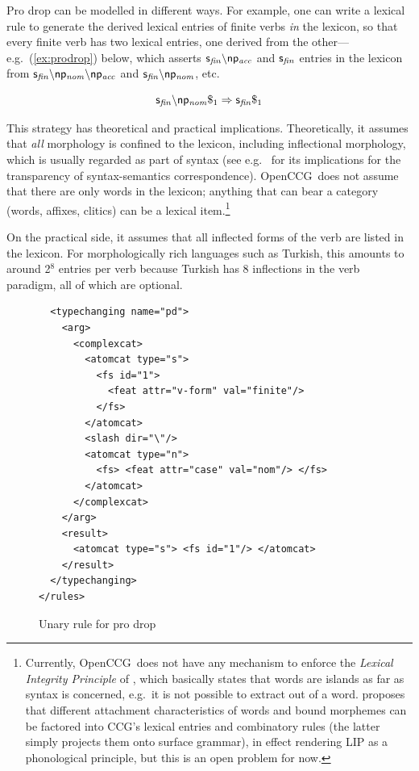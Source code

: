 \documentclass[11pt]{article}
\newcommand{\occg}{OpenCCG}
\begin{document}
Pro drop can be modelled in different ways. For example, one can write a
lexical rule to generate the derived lexical entries of finite verbs
\emph{in} the lexicon, so that every finite verb has two lexical
entries, one derived from the other---e.g.\ (\ref{ex:prodrop}) below,
which asserts $\mathsf{s_{\mathit{fin}}}\backslash\mathsf{np_{\mathit{acc}}}$ and $\mathsf{s_{\mathit{fin}}}$
entries in the lexicon from
$\mathsf{s_{\mathit{fin}}}\backslash\mathsf{np_{\mathit{nom}}}\backslash\mathsf{np_{\mathit{acc}}}$ and
$\mathsf{s_{\mathit{fin}}}\backslash\mathsf{np_{\mathit{nom}}}$, etc.

\begin{equation}
\label{ex:prodrop}
\mathsf{s_{\mathit{fin}}}\backslash\mathsf{np_{\mathit{nom}}}\$_1
\Rightarrow 
\mathsf{s_{\mathit{fin}}}\$_1
\end{equation}

This strategy has theoretical and practical implications. Theoretically,
it assumes that \emph{all} morphology is confined to the lexicon,
including inflectional morphology, which is usually regarded as part of
syntax (see e.g.\ \cite{bozsahin02cl} for its implications for the
transparency of syntax-semantics correspondence). \occg\ does not assume
that there are only words in the lexicon; anything that can bear a
category (words, affixes, clitics) can be a lexical
item.\footnote{Currently, \occg\ does not have any mechanism to enforce
the \emph{Lexical Integrity Principle} of \cite{bresnanmchombo95}, which
basically states that words are islands as far as syntax is concerned,
e.g.\ it is not possible to extract out of a word. \cite{bozsahin02cl}
proposes that different attachment characteristics of words and bound
morphemes can be factored into CCG's lexical entries and combinatory
rules (the latter simply projects them onto surface grammar), in effect
rendering LIP as a phonological principle, but this is an open problem
for now.}

On the practical side, it assumes that all inflected forms of the verb
are listed in the lexicon. For morphologically rich languages such as
Turkish, this amounts to around 2$^{8}$ entries per verb because Turkish
has 8 inflections in the verb paradigm, all of which are optional.

\begin{figure}
\begin{verbatim}
  <typechanging name="pd">
    <arg>
      <complexcat>
        <atomcat type="s"> 
          <fs id="1"> 
            <feat attr="v-form" val="finite"/>
          </fs>
        </atomcat>
        <slash dir="\"/>
        <atomcat type="n"> 
          <fs> <feat attr="case" val="nom"/> </fs>
        </atomcat>
      </complexcat>
    </arg>
    <result>
      <atomcat type="s"> <fs id="1"/> </atomcat>
    </result>
  </typechanging>
</rules>
\end{verbatim}
\caption{Unary rule for pro drop}
\label{pro-drop-rule}
\end{figure}
\end{document}
